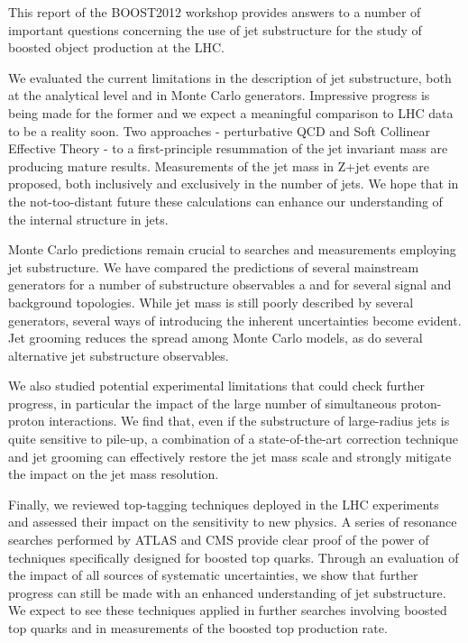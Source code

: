 This report of the BOOST2012 workshop provides answers to a number of 
important questions concerning the use of jet substructure for the 
study of boosted object production at the LHC. 


We evaluated the current limitations in the description of jet substructure,
both at the analytical level and in Monte Carlo generators. 
Impressive progress is being made for the former and we expect a meaningful 
comparison to LHC 
data to be a reality soon. Two approaches - perturbative QCD and
Soft Collinear Effective Theory - to a first-principle resummation of
the jet invariant mass are producing mature results. Measurements
of the jet mass in Z+jet events are proposed, both inclusively and
exclusively in the number of jets. We hope that in
the not-too-distant future these calculations can enhance our
understanding of the internal structure in jets.

Monte Carlo predictions remain crucial to searches and measurements
employing jet substructure. We have compared the predictions of
several mainstream generators for a number of substructure observables a
and for several signal and background topologies.
While jet mass is still poorly described
by several generators, several ways of introducing the inherent
uncertainties become evident. Jet grooming reduces the spread among
Monte Carlo models, as do several alternative jet substructure 
observables.

We also studied potential experimental limitations that could check further
progress, in particular the impact of the large number of simultaneous
proton-proton interactions. We find that, even if the substructure of
large-radius jets is quite sensitive to pile-up, a combination of 
a state-of-the-art correction technique and jet grooming can effectively
restore the jet mass scale and strongly mitigate the impact on the 
jet mass resolution.

Finally, we reviewed top-tagging techniques deployed in the LHC experiments
and assessed their impact on the sensitivity to new physics. A series
of \ttbar{} resonance searches performed by ATLAS and CMS provide
clear proof of the power of techniques specifically designed for 
boosted top quarks. Through an evaluation of the impact of all
sources of systematic uncertainties, we show that further progress
can still be made with an enhanced understanding of jet substructure.
We expect to see these techniques applied in further searches involving
boosted top quarks and in measurements of the boosted top production
rate.
